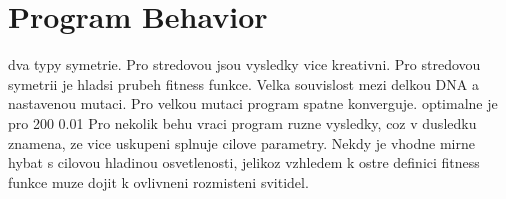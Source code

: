 \section{Program Behavior}
dva typy symetrie. Pro stredovou jsou vysledky vice kreativni. Pro stredovou symetrii je hladsi prubeh fitness funkce.
Velka souvislost mezi delkou DNA a nastavenou mutaci. Pro velkou mutaci program spatne konverguje. optimalne je pro 200 0.01
Pro nekolik behu vraci program ruzne vysledky, coz v dusledku znamena, ze vice uskupeni splnuje cilove parametry.
Nekdy je vhodne mirne hybat s cilovou hladinou osvetlenosti, jelikoz vzhledem k ostre definici fitness funkce muze dojit k ovlivneni rozmisteni svitidel.
